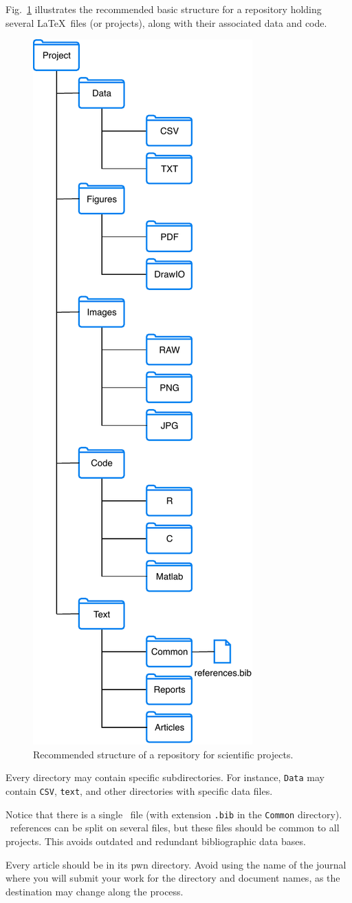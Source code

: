 \documentclass[journal]{IEEEtran}
\begin{document}
Fig.~\ref{Fig:StructRepo} illustrates the recommended basic structure for a repository holding several \LaTeX\ files (or projects), along with their associated data and code.

\begin{figure}[hbt]
	\centering
	\includegraphics[width=.35\columnwidth]{DirectoryStructure}
	\caption{Recommended structure of a repository for scientific projects.}\label{Fig:StructRepo}
\end{figure}

Every directory may contain specific subdirectories.
For instance, \verb|Data| may contain \verb|CSV|, \verb|text|, and other directories with specific data files.

Notice that there is a single \BibTeX\ file (with extension \verb|.bib| in the \verb|Common| directory).
\BibTeX\ references can be split on several files, but these files should be common to all projects.
This avoids outdated and redundant bibliographic data bases.

Every article should be in its pwn directory.
Avoid using the name of the journal where you will submit your work for the directory and document names, as the destination may change along the process.
\end{document}
